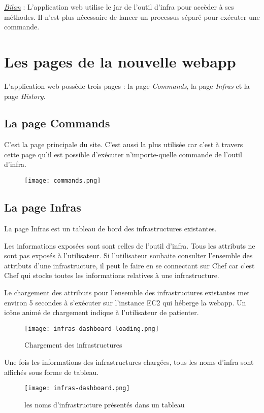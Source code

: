 \underline{\textit{Bilan}} : L'application web utilise le jar de l'outil d'infra
pour accèder à ses méthodes. Il n'est plus nécessaire de lancer un processus
séparé pour exécuter une commande.

\section{Les pages de la nouvelle webapp}
L'application web possède trois pages :
la page \textit{Commands}, la page \textit{Infras} et la page \textit{History}.

\subsection{La page Commands}

C'est la page principale du site. C'est aussi la plus utilisée car c'est à
travers cette page qu'il est possible d'exécuter n'importe-quelle commande de
l'outil d'infra. 

\begin{figure}[H]
  \texttt{[image: commands.png]}  
\end{figure}

\subsection{La page Infras}

La page Infras est un tableau de bord des infrastructures existantes.

Les informations exposées sont sont celles de l'outil d'infra. Tous les
attributs ne sont pas exposés à l'utilisateur. Si l'utilisateur souhaite
consulter l'ensemble des attributs d'une infrastructure, il peut le faire en se
connectant sur Chef car c'est Chef qui stocke toutes les informations relatives
à une infrastructure.

Le chargement des attributs pour l'ensemble des infrastructures existantes met
environ 5 secondes à s'exécuter sur l'instance EC2 qui héberge la webapp.
Un icône animé de chargement indique à l'utilisateur de patienter.

\begin{figure}[H]
  \texttt{[image: infras-dashboard-loading.png]}  
  \caption{Chargement des infrastructures}
\end{figure}

Une fois les informations des infrastructures chargées, tous les noms d'infra
sont affichés sous forme de tableau.
\begin{figure}[H]
  \texttt{[image: infras-dashboard.png]}  
  \caption{les noms d'infrastructure présentés dans un tableau}
\end{figure}

